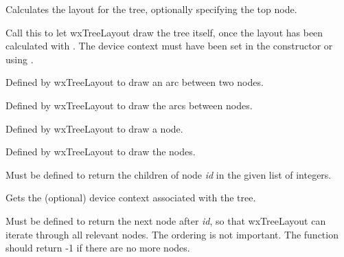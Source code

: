 \label{dolayout}


Calculates the layout for the tree, optionally specifying the top node.

\label{draw}


Call this to let wxTreeLayout draw the tree itself, once the layout has been
calculated with . The device context must
have been set in the constructor or using .



Defined by wxTreeLayout to draw an arc between two nodes.



Defined by wxTreeLayout to draw the arcs between nodes.



Defined by wxTreeLayout to draw a node.



Defined by wxTreeLayout to draw the nodes.

\label{getchildren}


Must be defined to return the children of node {\it id} in the given list
of integers.



Gets the (optional) device context associated with the tree.

\label{getnextnode}


Must be defined to return the next node after {\it id}, so that wxTreeLayout can
iterate through all relevant nodes. The ordering is not important.
The function should return -1 if there are no more nodes.

